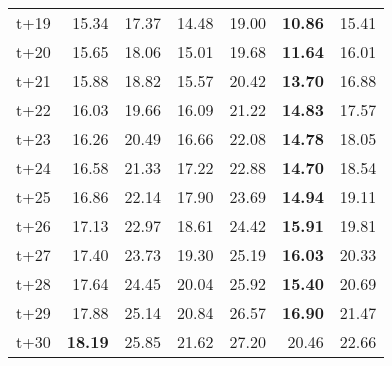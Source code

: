 \begin{table}[H]
\begin{tabular}{lrrrrrr}
t+19  & 15.34  & 17.37  & 14.48  & 19.00  & \textbf{10.86}  & 15.41  \\
t+20  & 15.65  & 18.06  & 15.01  & 19.68  & \textbf{11.64}  & 16.01  \\
t+21  & 15.88  & 18.82  & 15.57  & 20.42  & \textbf{13.70}  & 16.88  \\
t+22  & 16.03  & 19.66  & 16.09  & 21.22  & \textbf{14.83}  & 17.57  \\
t+23  & 16.26  & 20.49  & 16.66  & 22.08  & \textbf{14.78}  & 18.05  \\
t+24  & 16.58  & 21.33  & 17.22  & 22.88  & \textbf{14.70}  & 18.54  \\
t+25  & 16.86  & 22.14  & 17.90  & 23.69  & \textbf{14.94}  & 19.11  \\
t+26  & 17.13  & 22.97  & 18.61  & 24.42  & \textbf{15.91}  & 19.81  \\
t+27  & 17.40  & 23.73  & 19.30  & 25.19  & \textbf{16.03}  & 20.33  \\
t+28  & 17.64  & 24.45  & 20.04  & 25.92  & \textbf{15.40}  & 20.69  \\
t+29  & 17.88  & 25.14  & 20.84  & 26.57  & \textbf{16.90}  & 21.47  \\
t+30  & \textbf{18.19}  & 25.85  & 21.62  & 27.20  & 20.46  & 22.66  \\

\bottomrule
\end{tabular}
\end{table}
